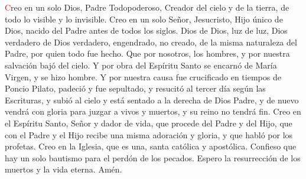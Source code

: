 \textcolor{red}{C}reo en un solo Dios, Padre Todopoderoso, Creador del cielo y de la tierra, de todo lo visible y lo invisible. 
Creo en un solo Señor, Jesucristo, Hijo único de Dios, nacido del Padre antes de todos los siglos. Dios de Dios, luz de luz, 
Dios verdadero de Dios verdadero, engendrado, no creado, de la misma naturaleza del Padre, por quien todo fue hecho. Que por nosotros, los hombres, 
y por nuestra salvación bajó del cielo. Y por obra del Espíritu Santo se encarnó de María Virgen, y se hizo hombre. 
Y por nuestra causa fue crucificado en tiempos de Poncio Pilato, padeció y fue sepultado, y resucitó al tercer día según las Escrituras, 
y subió al cielo y está sentado a la derecha de Dios Padre, y de nuevo vendrá con gloria para juzgar a vivos y muertos, y su reino no tendrá fin. 
Creo en el Espíritu Santo, Señor y dador de vida, que procede del Padre y del Hijo, que con el Padre y el Hijo recibe una misma adoración y gloria, 
y que habló por los profetas. Creo en la Iglesia, que es una, santa católica y apostólica. Confieso que hay un solo bautismo para el perdón de los pecados. 
Espero la resurrección de los muertos y la vida eterna. Amén.
